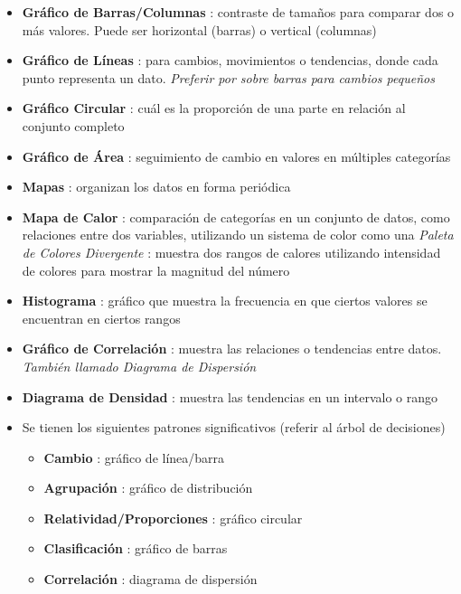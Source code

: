 \begin{itemize}
    \item {\textbf{Gráfico de Barras/Columnas} : contraste de tamaños para comparar dos o más valores. Puede ser horizontal (barras) o vertical (columnas)}
    \item {\textbf{Gráfico de Líneas} : para cambios, movimientos o tendencias, donde cada punto representa un dato. \textit{Preferir por sobre barras para cambios pequeños}}
    \item {\textbf{Gráfico Circular} : cuál es la proporción de una parte en relación al conjunto completo}
    \item {\textbf{Gráfico de Área} : seguimiento de cambio en valores en múltiples categorías}
    \item {\textbf{Mapas} : organizan los datos en forma periódica}
    \item {\textbf{Mapa de Calor} : comparación de categorías en un conjunto de datos, como relaciones entre dos variables, utilizando un sistema de color como una \textit{Paleta de Colores Divergente} : muestra dos rangos de calores utilizando intensidad de colores para mostrar la magnitud del número}
    \item {\textbf{Histograma} : gráfico que muestra la frecuencia en que ciertos valores se encuentran en ciertos rangos}
    \item {\textbf{Gráfico de Correlación} : muestra las relaciones o tendencias entre datos. \textit{También llamado Diagrama de Dispersión}}
    \item {\textbf{Diagrama de Densidad} : muestra las tendencias en un intervalo o rango}
    \item {Se tienen los siguientes patrones significativos (referir al árbol de decisiones)
    \begin{itemize}
        \item {\textbf{Cambio} : gráfico de línea/barra}
        \item {\textbf{Agrupación} : gráfico de distribución}
        \item {\textbf{Relatividad/Proporciones} : gráfico circular}
        \item {\textbf{Clasificación} : gráfico de barras}
        \item {\textbf{Correlación} : diagrama de dispersión}
    \end{itemize}}
\end{itemize}


